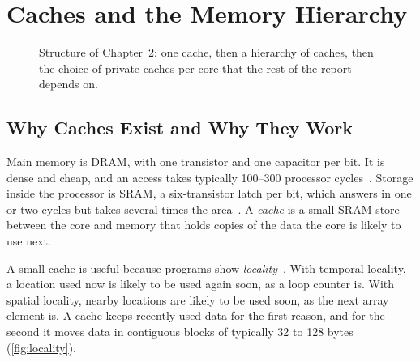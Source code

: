 \chapter{Caches and the Memory Hierarchy}
\label{ch:caches}

\begin{figure}[htbp]
\centering
{}
\caption[]{Structure of Chapter~2: one cache, then a
hierarchy of caches, then the choice of private caches per core that the rest of
the report depends on.}
\label{fig:ch2-map}
\end{figure}

\section{Why Caches Exist and Why They Work}
\label{sec:cache-why}
\label{sec:cache-locality}
%

Main memory is DRAM, with one transistor and one capacitor per bit. It is dense
and cheap, and an access takes typically 100--300 processor
cycles~\cite[\S11.1.7]{sarangi2025basic}. Storage inside the processor is SRAM,
a six-transistor latch per bit, which answers in one or two cycles but takes
several times the area~\cite[\S7.4]{sarangi2025basic}. A
\emph{cache} is a small SRAM store between the core and memory that
holds copies of the data the core is likely to use next.

A small cache is useful because programs show
\emph{locality}~\cite[\S11.1.3--11.1.6]{sarangi2025basic}. With
temporal locality, a location used now is likely to be used again soon, as a loop
counter is. With spatial locality, nearby locations are likely to be used soon, as
the next array element is. A cache keeps recently used data for the first reason,
and for the second it moves data in contiguous \glspl{block} of typically 32 to
128 bytes~\cite[\S11.1.8]{sarangi2025basic} (\cref{fig:locality}).

